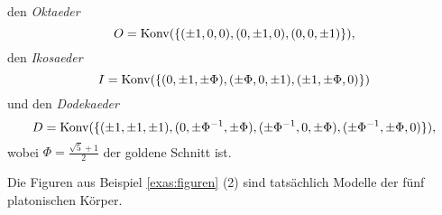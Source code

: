 \documentclass{book}
\begin{document}
\begin{exas}
\begin{enumerate}
\[            \]
            den {\em Oktaeder}
            \[
                O = \operatorname{Konv}(\{( \pm 1,0,0), ( 0,\pm 1,0), ( 0,0,\pm 1) \}),
            \]
            den {\em Ikosaeder} 
            \[
                I = \operatorname{Konv}(\{(0, \pm 1, \pm \Phi),
                (\pm \Phi, 0, \pm 1),
                (\pm 1, \pm \Phi, 0) \})
            \]
            und den {\em Dodekaeder}
            \[
                D = \operatorname{Konv}(\{ (\pm 1, \pm 1, \pm 1),
                    (0, \pm \Phi^{-1}, \pm \Phi),
                    (\pm \Phi^{-1}, 0, \pm \Phi),
                    (\pm \Phi^{-1}, \pm \Phi, 0)
                \}),
            \]
            wobei $\Phi = \frac{\sqrt{5} + 1}{2}$ der goldene Schnitt ist. 
    \end{enumerate}
\end{exas}

\begin{prob}
    \label{prob:}
    Die Figuren aus Beispiel \ref{exas:figuren} (2) sind tatsächlich Modelle der fünf platonischen Körper. 
\end{prob}
\end{document}
